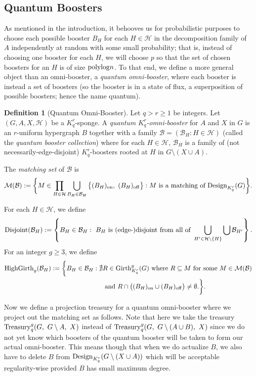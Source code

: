 \documentclass[11pt]{article}
\newcommand{\mc}[1]{\mathcal{#1}}
\newcounter{i}
\theoremstyle{plain}
\theoremstyle{plain} %
\theoremstyle{definition}
\newtheorem{definition}[thm]{Definition}
\begin{document}
\subsection{Quantum Boosters}

As mentioned in the introduction, it behooves us for probabilistic purposes to choose each possible booster $B_H$ for each $H\in\mathcal{H}$ in the decomposition family of $A$ independently at random with some small probability; that is, instead of choosing one booster for each $H$, we will choose $p$ so that the set of chosen boosters for an $H$ is of size ${\rm polylog} n$. To that end, we define a more general object than an omni-booster, a \emph{quantum omni-booster}, where each booster is instead a set of boosters (so the booster is in a state of flux, a superposition of possible boosters; hence the name quantum).

\begin{definition}[Quantum Omni-Booster]\label{def:QuantumOmniBooster}
Let $q > r\ge 1$ be integers. Let $(G,A,X,\mc{H})$ be a $K_q^r$-sponge. A \emph{quantum $K_q^r$-omni-booster} for $A$ and $X$ in $G$ is an $r$-uniform hypergraph $B$ together with a family $\mc{B}=(\mathcal{B}_H: H\in \mathcal{H})$ (called the \emph{quantum booster collection}) where for each $H\in \mathcal{H}$, $\mathcal{B}_H$ is a family of (not necessarily-edge-disjoint) $K_q^r$-boosters rooted at $H$ in $G\setminus (X\cup A)$. 

The \emph{matching set} of $\mc{B}$ is 
$$\mc{M}(\mc{B}):= \bigg\{ M \in \prod_{H\in \mathcal{H}} \bigcup_{B_H\in \mathcal{B}_H} \big\{ (B_{H})_{{\rm on}},~ (B_{H})_{{\rm off}} \big\} : M \text{ is a matching of } {\rm Design}_{K_q^r}(G)\bigg\}.$$

For each $H\in \mathcal{H}$, we define 
$${\rm Disjoint}(\mathcal{B}_{H}) := \left\{B_H \in \mathcal{B}_{H}:~ B_H \text{ is (edge-)disjoint from all of }\bigcup_{H' \in \mathcal{H}\setminus \{H\}} \bigcup \mathcal{B}_{H'}\right\}.$$
For an integer $g\ge 3$, we define
\begin{align*}{\rm HighGirth}_g(\mathcal{B}_{H}) := \bigg\{B_H \in \mathcal{B}_{H}: \nexists &R\in {\rm Girth}_{K_q^r}^g(G) \text{ where } R\subseteq M \text{ for some } M \in \mc{M}(\mc{B}) \\
&\text{ and } R\cap \big( (B_H)_{\rm on}\cup (B_H)_{\rm off}\big)\ne \emptyset. \bigg\}.
\end{align*}
\end{definition}

Now we define a projection treasury for a quantum omni-booster where we project out the matching set as follows. Note that here we take the treasury ${\rm Treasury}_q^g(G,~G\setminus A,~X)$ instead of ${\rm Treasury}_q^g(G,~G\setminus (A\cup B),~X)$ since we do not yet know which boosters  of the quantum booster will be taken to form our actual omni-booster. This means though that when we do actualize $B$, we also have to delete $B$ from ${\rm Design}_{K_q^r}(G\setminus (X\cup A))$ which will be acceptable regularity-wise provided $B$ has small maximum degree.
\end{document}

